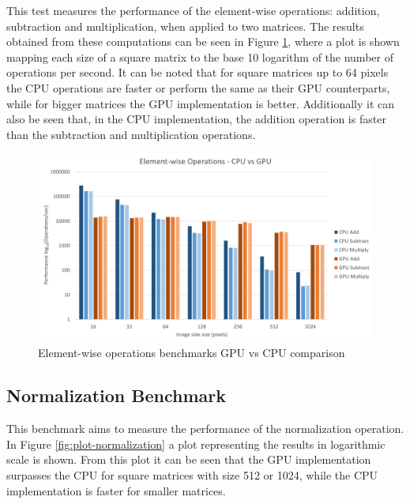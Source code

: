       This test measures the performance of the element-wise operations: addition, subtraction and multiplication, when applied to two matrices. The results obtained from these computations can be seen in Figure \ref{fig:plot-ewops}, where a plot is shown mapping each size of a square matrix to the base 10 logarithm of the number of operations per second. It can be noted that for square matrices up to 64 pixels the CPU operations are faster or perform the same as their GPU counterparts, while for bigger matrices the GPU implementation is better. Additionally it can also be seen that, in the CPU implementation, the addition operation is faster than the subtraction and multiplication operations.
    
      \begin{figure}[H]
      	\centering
      	\includegraphics[width=\plotwidth]{images/results/benchmarks/plot-ewops}
      	\caption{Element-wise operations benchmarks GPU vs CPU comparison}
      	\label{fig:plot-ewops}
      \end{figure}
    
    \subsection{Normalization Benchmark}
    
      This benchmark aims to measure the performance of the normalization operation. In Figure \ref{fig:plot-normalization} a plot representing the results in logarithmic scale is shown. From this plot it can be seen that the GPU implementation surpasses the CPU for square matrices with size 512 or 1024, while the CPU implementation is faster for smaller matrices.
    
